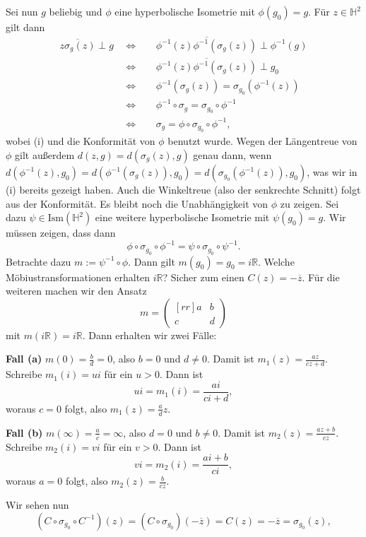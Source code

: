 \documentclass[11pt]{book}
\numberwithin{dummy}{section}
\theoremstyle{nonumberbreak}
\newenvironment{prob}[1][]{\ifthenelse{\equal{#1}{}}{\problem}{\problem[#1]}\rm}{\endproblem}
\newenvironment{sol}[1][]{\ifthenelse{\equal{#1}{}}{\solution}{\solution[#1]}\rm}{\endsolution}
\newcommand{\R}{\mathbb{R}}
\newcommand{\He}{\mathbb{H}}
\newcommand{\matx}[4]{\begin{pmatrix}[rr]#1 & #2 \\[-6pt] #3 & #4 \end{pmatrix}}
\begin{document}
\begin{spacing}{1.4}
\begin{prob}
\begin{sol}
\begin{compactenum}
\item Sei nun $g$ beliebig und $\phi$ eine hyperbolische Isometrie mit $\phi(g_0)=g$. Für $z \in \He^2$ gilt dann 
\begin{alignat*}{5}
\overline{z \sigma_g(z)} \perp g \ \ &\Longleftrightarrow&& \ \ \overline{\phi^{-1}(z) \phi^{-1}(\sigma_g(z))} \perp \phi^{-1}(g) \\
&\Longleftrightarrow&& \ \ \overline{\phi^{-1}(z) \phi^{-1}(\sigma_g(z))} \perp g_0 \\
&\Longleftrightarrow&& \ \ \phi^{-1}(\sigma_g(z)) = \sigma_{g_0}(\phi^{-1}(z)) \\
&\Longleftrightarrow&& \ \ \phi^{-1} \circ \sigma_g = \sigma_{g_0}\circ \phi^{-1} \\
&\Longleftrightarrow&& \ \ \sigma_g = \phi \circ \sigma_{g_0} \circ \phi^{-1},
\end{alignat*}
wobei (i) und die Konformität von $\phi$ benutzt wurde. Wegen der Längentreue von $\phi$ gilt außerdem $d(z,g) = d(\sigma_g(z),g)$ genau dann, wenn $d\left( \phi^{-1}(z), g_0\right) = d\left( \phi^{-1}(\sigma_g(z)), g_0\right) = d\left( \sigma_{g_0}(\phi^{-1}(z)), g_0\right)$, was wir in (i) bereits gezeigt haben. Auch die Winkeltreue (also der senkrechte Schnitt) folgt aus der Konformität. Es bleibt noch die Unabhängigkeit von $\phi$ zu zeigen. Sei dazu $\psi \in \mathrm{Ism}(\He^2)$ eine weitere hyperbolische Isometrie mit $\psi(g_0)=g$. Wir müssen zeigen, dass dann 
$$\phi \circ \sigma_{g_0} \circ \phi^{-1} = \psi \circ \sigma_{g_0} \circ \psi^{-1}.$$
Betrachte dazu $m:= \psi^{-1} \circ \phi$. Dann gilt $m(g_0)=g_0 = i \R$. Welche Möbiustransformationen erhalten $i\R$? Sicher zum einen $C(z)=-\overline{z}$. Für die weiteren machen wir den Ansatz $$m= \matx{a}{b}{c}{d}$$ mit $m(i\R)=i\R$. Dann erhalten wir zwei Fälle:
\begin{compactenum}
\item[\textbf{Fall (a)}] $m(0)= \frac{b}{d}=0$, also $b=0$ und $d\neq 0$. Damit ist $m_1(z)= \frac{az}{cz+d}$. Schreibe $m_1(i)=ui$ für ein $u >0$. Dann ist 
$$ui=m_1(i)=\frac{ai}{ci+d},$$
woraus $c=0$ folgt, also $m_1(z)= \frac{a}{d}z$.
\item[\textbf{Fall (b)}] $m(\infty)=\frac{a}{c} = \infty$, also $d=0$ und $b \neq 0$. Damit ist $m_2(z)=\frac{az+b}{cz}$. Schreibe $m_2(i)=vi$ für ein $v >0$. Dann ist
$$vi=m_2(i) = \frac{ai+b}{ci},$$
woraus $a=0$ folgt, also $m_2(z)= \frac{b}{cz}$.
\end{compactenum}
Wir sehen nun 
$$(C \circ \sigma_{g_0} \circ C^{-1})(z) = ( C \circ \sigma_{g_0})(-\overline{z}) = C( z) = - \overline{z} = \sigma_{g_0}(z),$$

\end{compactenum}
\end{sol}
\end{prob}
\end{spacing}
\end{document}
